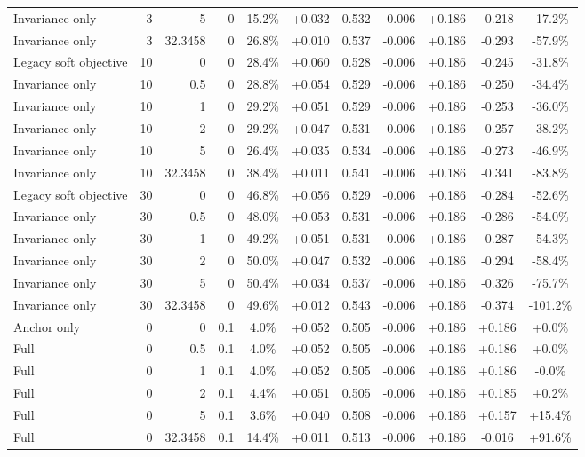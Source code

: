 \begin{table}[htbp]
\begin{tabular}{lrrrccccccc}
Invariance only & 3 & 5 & 0 & 15.2\% & +0.032 & 0.532 & -0.006 & +0.186 & -0.218 & -17.2\% \\
Invariance only & 3 & 32.3458 & 0 & 26.8\% & +0.010 & 0.537 & -0.006 & +0.186 & -0.293 & -57.9\% \\
Legacy soft objective & 10 & 0 & 0 & 28.4\% & +0.060 & 0.528 & -0.006 & +0.186 & -0.245 & -31.8\% \\
Invariance only & 10 & 0.5 & 0 & 28.8\% & +0.054 & 0.529 & -0.006 & +0.186 & -0.250 & -34.4\% \\
Invariance only & 10 & 1 & 0 & 29.2\% & +0.051 & 0.529 & -0.006 & +0.186 & -0.253 & -36.0\% \\
Invariance only & 10 & 2 & 0 & 29.2\% & +0.047 & 0.531 & -0.006 & +0.186 & -0.257 & -38.2\% \\
Invariance only & 10 & 5 & 0 & 26.4\% & +0.035 & 0.534 & -0.006 & +0.186 & -0.273 & -46.9\% \\
Invariance only & 10 & 32.3458 & 0 & 38.4\% & +0.011 & 0.541 & -0.006 & +0.186 & -0.341 & -83.8\% \\
Legacy soft objective & 30 & 0 & 0 & 46.8\% & +0.056 & 0.529 & -0.006 & +0.186 & -0.284 & -52.6\% \\
Invariance only & 30 & 0.5 & 0 & 48.0\% & +0.053 & 0.531 & -0.006 & +0.186 & -0.286 & -54.0\% \\
Invariance only & 30 & 1 & 0 & 49.2\% & +0.051 & 0.531 & -0.006 & +0.186 & -0.287 & -54.3\% \\
Invariance only & 30 & 2 & 0 & 50.0\% & +0.047 & 0.532 & -0.006 & +0.186 & -0.294 & -58.4\% \\
Invariance only & 30 & 5 & 0 & 50.4\% & +0.034 & 0.537 & -0.006 & +0.186 & -0.326 & -75.7\% \\
Invariance only & 30 & 32.3458 & 0 & 49.6\% & +0.012 & 0.543 & -0.006 & +0.186 & -0.374 & -101.2\% \\
Anchor only & 0 & 0 & 0.1 & 4.0\% & +0.052 & 0.505 & -0.006 & +0.186 & +0.186 & +0.0\% \\
Full & 0 & 0.5 & 0.1 & 4.0\% & +0.052 & 0.505 & -0.006 & +0.186 & +0.186 & +0.0\% \\
Full & 0 & 1 & 0.1 & 4.0\% & +0.052 & 0.505 & -0.006 & +0.186 & +0.186 & -0.0\% \\
Full & 0 & 2 & 0.1 & 4.4\% & +0.051 & 0.505 & -0.006 & +0.186 & +0.185 & +0.2\% \\
Full & 0 & 5 & 0.1 & 3.6\% & +0.040 & 0.508 & -0.006 & +0.186 & +0.157 & +15.4\% \\
Full & 0 & 32.3458 & 0.1 & 14.4\% & +0.011 & 0.513 & -0.006 & +0.186 & -0.016 & +91.6\% \\

\end{tabular}
\end{table}
